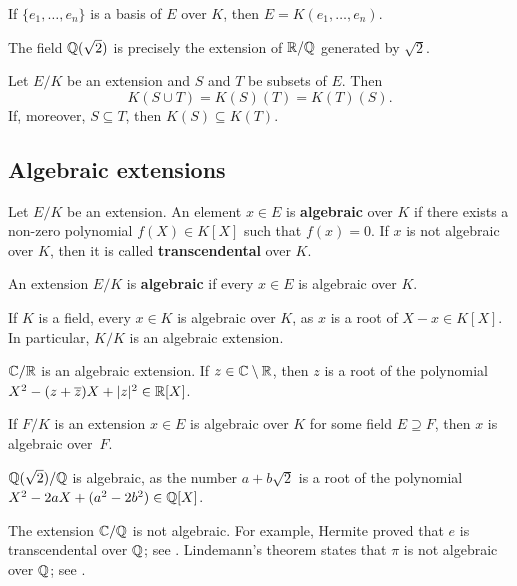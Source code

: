 \begin{example}
	If $\{e_1,\dots,e_n\}$ is a basis of $E$ over $K$, 
	then $E=K(e_1,\dots,e_n)$. 
\end{example}

\begin{example}
	The field $\mathbb{Q}(\sqrt{2})$ is precisely the extension 
	of $\mathbb{R}/\mathbb{Q}$ generated by $\sqrt{2}$. 
\end{example}

Let $E/K$ be an extension and $S$ and $T$ be subsets of $E$.
Then 
\[
	K(S\cup T)=K(S)(T)=K(T)(S).
\]
If, moreover, 
$S\subseteq T$, then $K(S)\subseteq K(T)$. 

\subsection{Algebraic extensions}

\begin{definition}
	Let $E/K$ be an extension. An element $x\in E$
	is \textbf{algebraic} over $K$ if there
	exists a non-zero polynomial 
	$f(X)\in K[X]$ such that $f(x)=0$. If $x$ is
	not algebraic over $K$, 
	then it is called \textbf{transcendental} over $K$.
\end{definition}

\begin{definition}	
	An extension $E/K$ is \textbf{algebraic} if 
	every $x\in E$ is algebraic over $K$. 
\end{definition}

If $K$ is a field, every $x\in K$ is algebraic over $K$,
as $x$ is a root of $X-x\in K[X]$. In particular, $K/K$ is
an algebraic extension. 

\begin{example}
	$\mathbb{C}/\mathbb{R}$ is an algebraic extension. If $z\in\mathbb{C}\setminus\mathbb{R}$, then
	$z$ is a root of the polynomial 
	$X^2-(z+\overline{z})X+|z|^2\in\mathbb{R}[X]$. 
\end{example}

If $F/K$ is an extension $x\in E$ is algebraic
over $K$ for some field $E\supseteq F$, 
then $x$ is algebraic over~$F$. 

\begin{example}
	$\mathbb{Q}(\sqrt{2})/\mathbb{Q}$ is algebraic, as the number
	$a+b\sqrt{2}$ is a root of the polynomial
	$X^2-2aX+(a^2-2b^2)\in\mathbb{Q}[X]$. 
\end{example}

The extension $\mathbb{C}/\mathbb{Q}$ is not algebraic. For example, Hermite proved 
that $e$ is transcendental 
over $\mathbb{Q}$; see \cite[Theorem 24.4]{MR3379917}. Lindemann's theorem 
states that $\pi$ is 
not algebraic over $\mathbb{Q}$; see \cite[Theorem 24.5]{MR3379917}. 

